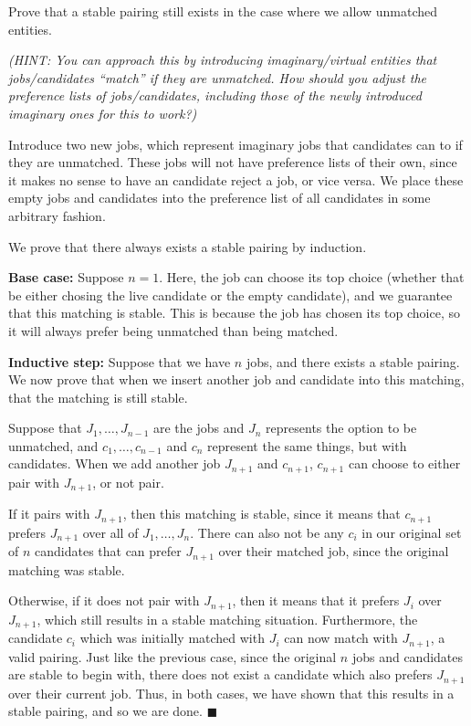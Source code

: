 \documentclass[11pt]{article}
\begin{document}
\begin{Parts}
\Part Prove that a stable pairing still exists in the case where we
allow unmatched entities.

{\em (HINT: You can approach this by
introducing imaginary/virtual entities that jobs/candidates ``match''
if they are unmatched. How should you adjust the preference lists of
jobs/candidates, including those of the newly introduced imaginary ones for
this to work?)}

\begin{solution}
    Introduce two new jobs, which represent imaginary jobs that candidates can  to if they are unmatched. These jobs will not have preference lists of their own, since it makes no sense to have an  candidate reject a job, or vice versa. We place these empty jobs and candidates into the preference list of all  candidates in some arbitrary fashion. 


    We prove that there always exists a stable pairing by induction. 

    \textbf{Base case:} Suppose $n = 1$. Here, the job can choose its top choice (whether that be either chosing the live candidate or the empty candidate), and we guarantee that this matching is stable. This is because the job has chosen its top choice, so it will always prefer being unmatched than being matched.


    \textbf{Inductive step:} Suppose that we have $n$ jobs, and there exists a stable pairing. We now prove that when we insert another job and candidate into this matching, that the matching is still stable. 


    Suppose that $J_1, \dots, J_{n-1}$ are the  jobs and $J_n$ represents the option to be unmatched, and $c_1, \dots, c_{n-1}$ and $c_n$ represent the same things, but with candidates. When we add another job $J_{n+1}$ and $c_{n+1}$, $c_{n+1}$ can choose to either pair with $J_{n+1}$, or not pair. 

    If it pairs with $J_{n+1}$, then this matching is stable, since it means that $c_{n+1}$ prefers $J_{n+1}$ over all of $J_1, \dots, J_n$. There can also not be any $c_i$ in our original set of $n$ candidates that can prefer $J_{n+1}$ over their matched job, since the original matching was stable. 

    Otherwise, if it does not pair with $J_{n+1}$, then it means that it prefers $J_i$ over $J_{n+1}$, which still results in a stable matching situation. Furthermore, the candidate $c_i$ which was initially matched with $J_i$ can now match with $J_{n+1}$, a valid pairing. Just like the previous case, since the original $n$ jobs and candidates are stable to begin with, there does not exist a candidate which also prefers $J_{n+1}$ over their current job. Thus, in both cases, we have shown that this results in a stable pairing, and so we are done. $\blacksquare$
  

\end{solution}
\end{Parts}
\end{document}
